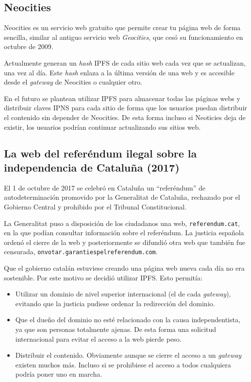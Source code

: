 \documentclass[12pt]{article} %
\begin{document}

\subsection{Neocities} %
\label{sub:neocities}

Neocities es un servicio web gratuito que permite crear tu página web de forma sencilla, similar al antiguo servicio web \textit{Geocities}, que cesó su funcionamiento en octubre de 2009.

Actualmente generan un \textit{hash} IPFS de cada sitio web cada vez que se actualizan, una vez al día. Este \textit{hash} enlaza a la última versión de una web y es accesible desde el \textit{gateway} de Neocities o cualquier otro. 

En el futuro se plantean utilizar IPFS para almacenar todas las páginas webs y distribuir claves IPNS para cada sitio de forma que los usuarios puedan distribuir el contenido sin depender de Neocities. De esta forma incluso si Neoticies deja de existir, los usuarios podrían continuar actualizando sus sitios web.


\subsection{La web del referéndum ilegal sobre la independencia de Cataluña (2017)} %
\label{sub:la_web_del_referéndum_catalán_de_2017}

El 1 de octubre de 2017 se celebró en Cataluña un ``referéndum'' de autodeterminación promovido por la Generalitat de Cataluña, rechazado por el Gobierno Central y prohibido por el Tribunal Constitucional. 

La Generalitat puso a disposición de los ciudadanos una web, \texttt{referendum.cat}, en la que podían consultar información sobre el referéndum. La justicia española ordenó el cierre de la web y posteriormente se difundió otra web que también fue censurada, \texttt{onvotar.garantiespelreferendum.com}.

Que el gobierno catalán estuviese creando una página web nueva cada día no era sostenible. Por este motivo se decidió utilizar IPFS. Esto permitía:
\begin{itemize}
	\item Utilizar un dominio de nivel superior internacional (el de cada \textit{gateway}), evitando que la justicia pudiese ordenar la redirección del dominio.
	\item Que el dueño del dominio no esté relacionado con la causa independentista, ya que son personas totalmente ajenas. De esta forma una solicitud internacional para evitar el acceso a la web pierde peso.
	\item Distribuir el contenido. Obviamente aunque se cierre el acceso a un \textit{gateway} existen muchos más. Incluso si se prohibiese el acceso a todos cualquiera podría poner uno en marcha.
\end{itemize}
\end{document}
